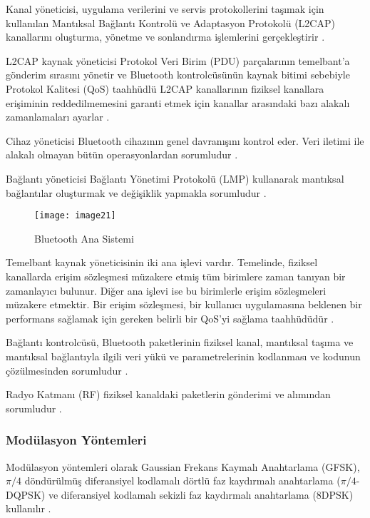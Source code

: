 Kanal yöneticisi, uygulama verilerini ve servis protokollerini taşımak için kullanılan Mantıksal Bağlantı Kontrolü ve
Adaptasyon Protokolü (L2CAP) kanallarını oluşturma, yönetme ve sonlandırma işlemlerini gerçekleştirir \cite{bluetooth2007core}.

L2CAP kaynak yöneticisi Protokol Veri Birim (PDU) parçalarının temelbant'a gönderim sırasını yönetir ve Bluetooth kontrolcüsünün kaynak bitimi sebebiyle Protokol Kalitesi (QoS) taahhüdlü L2CAP kanallarının fiziksel kanallara erişiminin reddedilmemesini garanti etmek için kanallar arasındaki bazı alakalı zamanlamaları ayarlar \cite{bluetooth2007core}.


Cihaz yöneticisi Bluetooth cihazının genel davranışını kontrol eder. Veri iletimi ile alakalı olmayan bütün operasyonlardan sorumludur \cite{bluetooth2007core}.


Bağlantı yöneticisi Bağlantı Yönetimi Protokolü (LMP) kullanarak mantıksal bağlantılar oluşturmak ve değişiklik yapmakla sorumludur \cite{bluetooth2007core}.

\begin{figure}[H]
    \centering
    \texttt{[image: image21]}
    \caption{Bluetooth Ana Sistemi}
    \label{fig:bluetooth_core}
\end{figure}



Temelbant kaynak yöneticisinin iki ana işlevi vardır. Temelinde, fiziksel kanallarda erişim sözleşmesi müzakere etmiş tüm birimlere zaman tanıyan bir zamanlayıcı bulunur. Diğer ana işlevi ise bu birimlerle erişim sözleşmeleri müzakere etmektir. Bir erişim sözleşmesi, bir kullanıcı uygulamasına beklenen bir performans sağlamak için gereken belirli bir QoS’yi sağlama taahhüdüdür \cite{bluetooth2007core}.


Bağlantı kontrolcüsü, Bluetooth paketlerinin fiziksel kanal, mantıksal taşıma ve mantıksal bağlantıyla ilgili veri yükü ve parametrelerinin kodlanması ve kodunun çözülmesinden sorumludur \cite{bluetooth2007core}.


Radyo Katmanı (RF) fiziksel kanaldaki paketlerin gönderimi ve alımından sorumludur \cite{bluetooth2007core}.


\subsubsection{Modülasyon Yöntemleri}

Modülasyon yöntemleri olarak Gaussian Frekans Kaymalı Anahtarlama (GFSK), $\pi/4$ döndürülmüş diferansiyel kodlamalı dörtlü faz kaydırmalı anahtarlama ($\pi/4$-DQPSK) ve diferansiyel kodlamalı sekizli faz kaydırmalı anahtarlama (8DPSK) kullanılır \cite{bluetooth2007core}.


